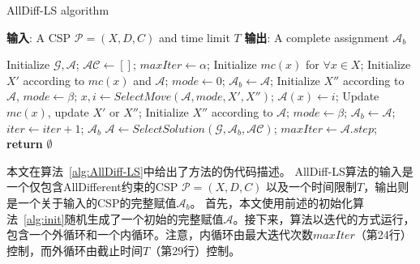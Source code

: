 \begin{algorithm}[h]
    \caption{AllDiff-LS algorithm}
    \label{alg:AllDiff-LS}
    \textbf{输入}: A CSP $\mathcal{P} = (X, D, C)$ and time limit $T$\newline
    \textbf{输出}: A complete assignment $\mathcal{A}_b$
    
    \begin{algorithmic}[1] %
        \Statex \hrulefill
        \STATE Initialize $\mathcal{G}, \mathcal{A}$; 
        \STATE $\mathcal{AC} \leftarrow []$;
        \STATE $maxIter \leftarrow \alpha$;
        \REPEAT
            \STATE Initialize $mc(x)$ for $\forall x \in X$;
            \STATE Initialize $X'$ according to $mc(x)$ and $\mathcal{A}$;
            \STATE $mode \leftarrow 0$;
            \STATE $\mathcal{A}_b \leftarrow \mathcal{A}$;
                \STATE Initialize $X''$ according to $\mathcal{A}$, $mode \leftarrow \beta$; 
            \ENDIF
            \REPEAT
                \STATE $x,i \leftarrow SelectMove(\mathcal{A}, mode, X', X'')$;
                \STATE $\mathcal{A}(x) \leftarrow i$;
                \STATE Update $mc(x)$, update $X'$ or $X''$;
                    \STATE Initialize $X''$ according to $\mathcal{A}$;
                    \STATE $mode \leftarrow \beta$; 
                \ENDIF
                    \STATE $\mathcal{A}_b \leftarrow \mathcal{A}$;
                \ENDIF
                \STATE $iter \leftarrow iter + 1$; 
                \RETURN $\mathcal{A}_b$
            \ENDIF
            \STATE $\mathcal{A} \leftarrow SelectSolution(\mathcal{G}, \mathcal{A}_b, \mathcal{AC})$;
            \STATE $maxIter \leftarrow \mathcal{A}.step$;
        \STATE \textbf{return} $\emptyset$
    \end{algorithmic}
\end{algorithm}

本文在算法~\ref{alg:AllDiff-LS}中给出了方法的伪代码描述。
AllDiff-LS算法的输入是一个仅包含AllDifferent约束的CSP $\mathcal{P} = (X, D, C)$ 以及一个时间限制$T$，输出则是一个关于输入的CSP的完整赋值$\mathcal{A}_b$。
首先，本文使用前述的初始化算法~\ref{alg:init}随机生成了一个初始的完整赋值$\mathcal{A}$。接下来，算法以迭代的方式运行，包含一个外循环和一个内循环。注意，内循环由最大迭代次数$maxIter$（第24行）控制，而外循环由截止时间$T$（第29行）控制。

